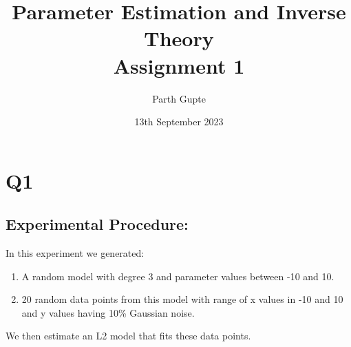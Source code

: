 \documentclass{article}
\title{Parameter Estimation and Inverse Theory\\ Assignment 1}
\author{Parth Gupte}
\date{13th September 2023}
\begin{document}
\maketitle
\section{Q1}
\subsection{Experimental Procedure:}
In this experiment we generated:\\
\begin{enumerate}
    \item A random model with degree 3 and parameter values between -10 and 10.
    \item 20 random data points from this model with range of x values in -10 and 10 and y values having 10\% Gaussian noise.
\end{enumerate}
We then estimate an L2 model that fits these data points.\\
\end{document}
